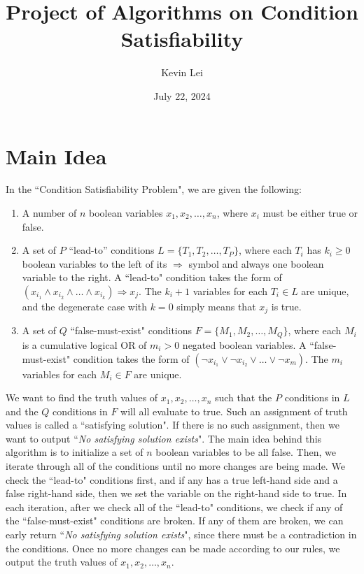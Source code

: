 \documentclass{article}
\title{Project of Algorithms on Condition Satisfiability}
\author{Kevin Lei}
\date{July 22, 2024}
\begin{document}
\maketitle

\section{Main Idea}

In the ``Condition Satisfiability Problem", we are given the following:
\begin{enumerate}
    \item A number of $n$ boolean variables $x_1, x_2, \ldots, x_n$, where $x_i$ must be either true or false.
    \item A set of $P$ ``lead-to'' conditions $L = \{T_1, T_2, \ldots, T_P\}$, where each $T_i$ has $k_i \geq 0$ boolean variables to the left of its $\Rightarrow$ symbol and always one boolean variable to the right.
    A ``lead-to" condition takes the form of $(x_{i_1} \land x_{i_2} \land \ldots \land x_{i_k}) \Rightarrow x_j$.
    The $k_i + 1$ variables for each $T_i \in L$ are unique, and the degenerate case with $k=0$ simply means that $x_j$ is true.
    \item A set of $Q$ ``false-must-exist" conditions $F = \{M_1, M_2, \ldots, M_Q\}$, where each $M_i$ is a cumulative logical OR of $m_i > 0$ negated boolean variables.
    A ``false-must-exist" condition takes the form of $(\neg x_{i_1} \lor \neg x_{i_2} \lor \ldots \lor \neg x_{m})$.
    The $m_i$ variables for each $M_i \in F$ are unique.
\end{enumerate}

We want to find the truth values of $x_1, x_2, \ldots, x_n$ such that the $P$ conditions in $L$ and the $Q$ conditions in $F$ will all evaluate to true.
Such an assignment of truth values is called a ``satisfying solution".
If there is no such assignment, then we want to output ``\textit{No satisfying solution exists}".
\vspace{1em}
\newline\noindent
The main idea behind this algorithm is to initialize a set of $n$ boolean variables to be all false.
Then, we iterate through all of the conditions until no more changes are being made.
We check the ``lead-to" conditions first, and if any has a true left-hand side and a false right-hand side, then we set the variable on the right-hand side to true.
In each iteration, after we check all of the ``lead-to" conditions, we check if any of the ``false-must-exist" conditions are broken.
If any of them are broken, we can early return ``\textit{No satisfying solution exists}", since there must be a contradiction in the conditions.
Once no more changes can be made according to our rules, we output the truth values of $x_1, x_2, \ldots, x_n$.
\end{document}
